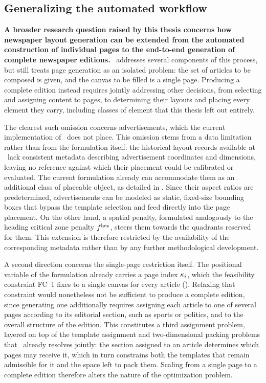 \subsection{Generalizing the automated workflow}
\label{sec:perspectives-workflow}

\textbf{A broader research question raised by this thesis concerns how newspaper layout generation can be extended from the automated construction of individual pages to the end-to-end generation of complete newspaper editions.} \methodNameGeneral\ addresses several components of this process, but still treats page generation as an isolated problem: the set of articles to be composed is given, and the canvas to be filled is a single page. Producing a complete edition instead requires jointly addressing other decisions, from selecting and assigning content to pages, to determining their layouts and placing every element they carry, including classes of element that this thesis left out entirely. 

The clearest such omission concerns advertisements, which the current implementation of \methodNameGeneral\ does not place. This omission stems from a data limitation rather than from the formulation itself: the historical layout records available at \melody\ lack consistent metadata describing advertisement coordinates and dimensions, leaving no reference against which their placement could be calibrated or evaluated. The current formulation already can accommodate them as an additional class of placeable object, as detailed in . Since their aspect ratios are predetermined, advertisements can be modeled as static, fixed-size bounding boxes that bypass the template selection and feed directly into the page placement. On the other hand, a spatial penalty, formulated analogously to the heading critical zone penalty $f^{\textrm{hcz}}$, steers them towards the quadrants reserved for them. This extension is therefore restricted by the availability of the corresponding metadata rather than by any further methodological development.

A second direction concerns the single-page restriction itself. The positional variable of the formulation already carries a page index $\kappa_{i}$, which the feasibility constraint FC~1 fixes to a single canvas for every article (). 
Relaxing that constraint would nonetheless not be sufficient to produce a complete edition, since generating one additionally requires assigning each article to one of several pages according to its editorial section, such as sports or politics, and to the overall structure of the edition. 
This constitutes a third assignment problem, layered on top of the template assignment and two-dimensional packing problems that \methodNameGeneral\ already resolves jointly: the section assigned to an article determines which pages may receive it, which in turn constrains both the templates that remain admissible for it and the space left to pack them. Scaling from a single page to a complete edition therefore alters the nature of the optimization problem.

